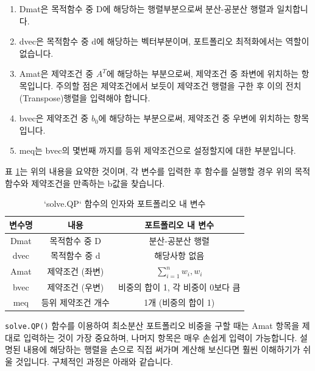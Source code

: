 \documentclass[12pt,]{book}
\providecommand{\tightlist}{%
  \setlength{\itemsep}{0pt}\setlength{\parskip}{0pt}}
\begin{document}
\begin{enumerate}
\def\labelenumi{\arabic{enumi}.}
\tightlist
\item
  Dmat은 목적함수 중 D에 해당하는 행렬부분으로써 분산-공분산 행렬과 일치합니다.
\item
  dvec은 목적함수 중 d에 해당하는 벡터부분이며, 포트폴리오 최적화에서는 역할이 없습니다.
\item
  Amat은 제약조건 중 \(A^T\)에 해당하는 부분으로써, 제약조건 중 좌변에 위치하는 항목입니다. 주의할 점은 제약조건에서 보듯이 제약조건 행렬을 구한 후 이의 전치(Transpose)행렬을 입력해야 합니다.
\item
  bvec은 제약조건 중 \(b_0\)에 해당하는 부분으로써, 제약조건 중 우변에 위치하는 항목입니다.
\item
  meq는 bvec의 몇번째 까지를 등위 제약조건으로 설정할지에 대한 부분입니다.
\end{enumerate}

표 \ref{tab:solveqp2}는 위의 내용을 요약한 것이며, 각 변수를 입력한 후 함수를 실행할 경우 위의 목적함수와 제약조건을 만족하는 b값을 찾습니다.

\begin{table}[!h]

\caption{\label{tab:solveqp2}`solve.QP` 함수의 인자와 포트폴리오 내 변수}
\centering
\begin{tabular}{ccc}
\toprule
변수명 & 내용 & 포트폴리오 내 변수\\
\midrule
\rowcolor{gray!6}  Dmat & 목적함수 중 D & 분산-공분산 행렬\\
dvec & 목적함수 중 d & 해당사항 없음\\
\rowcolor{gray!6}  Amat & 제약조건 (좌변) & $\sum_{i=1}^{n}w_i, w_i$\\
bvec & 제약조건 (우변) & 비중의 합이 1, 각 비중이 0보다 큼\\
\rowcolor{gray!6}  meq & 등위 제약조건 개수 & 1개 (비중의 합이 1)\\
\bottomrule
\end{tabular}
\end{table}

\texttt{solve.QP()} 함수를 이용하여 최소분산 포트폴리오 비중을 구할 때는 Amat 항목을 제대로 입력하는 것이 가장 중요하며, 나머지 항목은 매우 손쉽게 입력이 가능합니다. 설명된 내용에 해당하는 행렬을 손으로 직접 써가며 계산해 보신다면 훨씬 이해하기가 쉬울 것입니다. 구체적인 과정은 아래와 같습니다.
\end{document}
